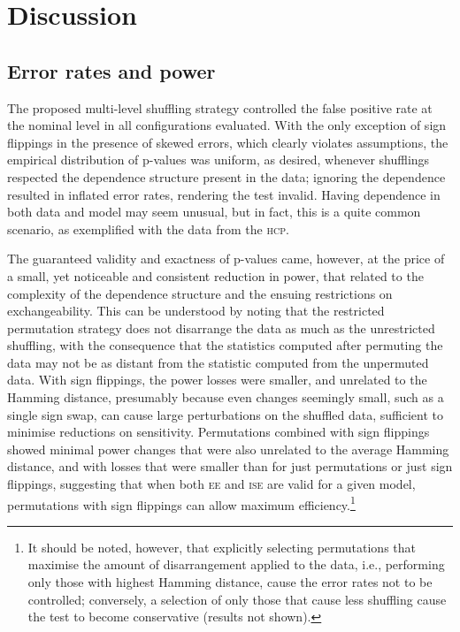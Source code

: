 \section{Discussion}

\subsection{Error rates and power}

The proposed multi-level shuffling strategy controlled the false positive rate at the nominal level in all configurations evaluated. With the only exception of sign flippings in the presence of skewed errors, which clearly violates assumptions, the empirical distribution of p-values was uniform, as desired, whenever shufflings respected the dependence structure present in the data; ignoring the dependence resulted in inflated error rates, rendering the test invalid. Having dependence in both data and model may seem unusual, but in fact, this is a quite common scenario, as exemplified with the data from the \textsc{hcp}.

The guaranteed validity and exactness of p-values came, however, at the price of a small, yet noticeable and consistent reduction in power, that related to the complexity of the dependence structure and the ensuing restrictions on exchangeability. This can be understood by noting that the restricted permutation strategy does not disarrange the data as much as the unrestricted shuffling, with the consequence that the statistics computed after permuting the data may not be as distant from the statistic computed from the unpermuted data. With sign flippings, the power losses were smaller, and unrelated to the Hamming distance, presumably because even changes seemingly small, such as a single sign swap, can cause large perturbations on the shuffled data, sufficient to minimise reductions on sensitivity. Permutations combined with sign flippings showed minimal power changes that were also unrelated to the average Hamming distance, and with losses that were smaller than for just permutations or just sign flippings, suggesting that when both \textsc{ee} and \textsc{ise} are valid for a given model, permutations with sign flippings can allow maximum efficiency.\footnote{It should be noted, however, that explicitly selecting permutations that maximise the amount of disarrangement applied to the data, i.e., performing only those with highest Hamming distance, cause the error rates not to be controlled; conversely, a selection of only those that cause less shuffling cause the test to become conservative (results not shown).}

